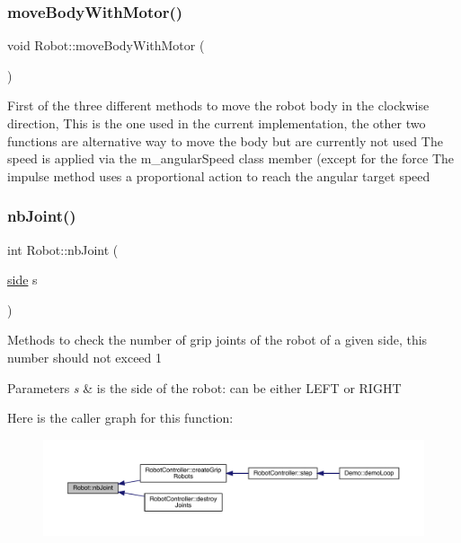 \subsubsection{\texorpdfstring{move\+Body\+With\+Motor()}{moveBodyWithMotor()}}
{\footnotesize\ttfamily void Robot\+::move\+Body\+With\+Motor (\begin{DoxyParamCaption}{ }\end{DoxyParamCaption})}

First of the three different methods to move the robot body in the clockwise direction, This is the one used in the current implementation, the other two functions are alternative way to move the body but are currently not used The speed is applied via the m\+\_\+angular\+Speed class member (except for the force The impulse method uses a proportional action to reach the angular target speed \mbox{\label{class_robot_ae6f0f49e30cf9c65605f6a75f390ec52}} 
\subsubsection{\texorpdfstring{nb\+Joint()}{nbJoint()}}
{\footnotesize\ttfamily int Robot\+::nb\+Joint (\begin{DoxyParamCaption}\item[{\mbox{\hyperlink{_robot_8h_afc015eff6557e84151d2e53b94375445}{side}}}]{s }\end{DoxyParamCaption})}

Methods to check the number of grip joints of the robot of a given side, this number should not exceed 1 
\begin{DoxyParams}{Parameters}
{\em s} & is the side of the robot\+: can be either L\+E\+FT or R\+I\+G\+HT \\
\hline
\end{DoxyParams}
Here is the caller graph for this function\+:\nopagebreak
\begin{figure}[H]
\begin{center}
\leavevmode
\includegraphics[width=350pt]{class_robot_ae6f0f49e30cf9c65605f6a75f390ec52_icgraph}
\end{center}
\end{figure}
\mbox{\label{class_robot_abbba5cddb2dc90005c26b99d968f102d}} 
